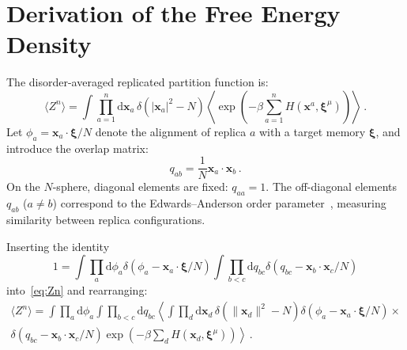 \documentclass{article}
\newcommand{\dd}{{\mathrm{d}}}
\theoremstyle{plain}
\theoremstyle{definition}
\theoremstyle{remark}
\begin{document}



\newpage
\appendix
\onecolumn
\section{Derivation of the Free Energy Density}

The disorder-averaged replicated partition function is:
\begin{equation}
    \langle Z^n \rangle = \int \prod_{a=1}^n \dd\bm{x}_a \, \delta(|\bm{x}_a|^2 - N) \left\langle \exp\left(-\beta \sum_{a=1}^n H(\bm{x}^a, \bm{\xi}^\mu)\right) \right\rangle\,.
    \label{eq:Zn}
\end{equation}
Let $\phi_a = \bm{x}_a \cdot \bm{\xi}/N$ denote the alignment of replica $a$ with a target memory $\bm{\xi}$, and introduce the overlap matrix:
\begin{equation}
    q_{ab} = \frac{1}{N} \bm{x}_a \cdot \bm{x}_b\,.
\end{equation}
On the $N$-sphere, diagonal elements are fixed: $q_{aa} = 1$. The off-diagonal elements $q_{ab}$ ($a \neq b$) correspond to the Edwards–Anderson order parameter~\citep{ea75}, measuring similarity between replica configurations.

Inserting the identity
\begin{equation}
1 = \int \prod_a \dd \phi_a \delta\left(\phi_a - \bm{x}_a \cdot \bm{\xi}/N\right) 
\int \prod_{b<c} \dd q_{bc} \delta\left(q_{bc} - \bm{x}_b \cdot \bm{x}_c/N\right)
\end{equation}
into~\eqref{eq:Zn} and rearranging:
\begin{multline}
\langle Z^n \rangle = \int \prod_a \dd \phi_a \int \prod_{b<c} \dd q_{bc} \left\langle \int \prod_d \dd \bm{x}_d \, \delta(\|\bm{x}_d\|^2 - N) \delta(\phi_a - \bm{x}_a \cdot \bm{\xi}/N) \right. \times \\
\left.  \delta(q_{bc} - \bm{x}_b \cdot \bm{x}_c/N) \exp\left(-\beta \sum_d H(\bm{x}_d, \bm{\xi}^\mu)\right) \right\rangle \,.
\end{multline}
\end{document}
